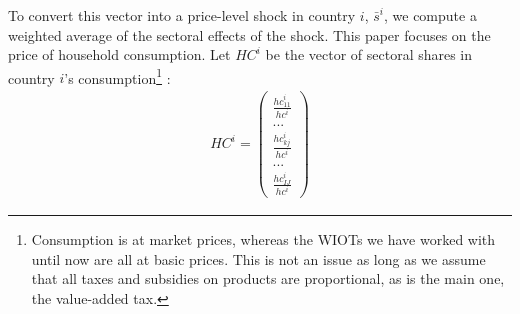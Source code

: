 \documentclass[11pt,a4paper]{article}
\begin{document}
To convert this vector into a price-level shock in country $i$, $\bar{s}^i$, we compute a weighted average of the sectoral effects of the shock. 
This paper focuses on the price of household consumption. Let $HC^i$ be the vector of sectoral shares in country $i$'s consumption\footnote{Consumption is at market prices, whereas the WIOTs we have worked with until now are all at basic prices. This is not an issue as long as we assume that all taxes and subsidies on products are proportional, as is the main one, the value-added tax.} :
\begin{eqnarray*}
HC^i=\left( 
	\begin{array}{c}
	\frac{{hc}_{11}^i}{hc^i} \\
	...\\
	\frac{{hc}_{kj}^i}{hc^i}\\
	...\\
	\frac{{hc}_{IJ}^i}{hc^i}
	 \end{array}
	 \right)
\end{eqnarray*}
\end{document}
